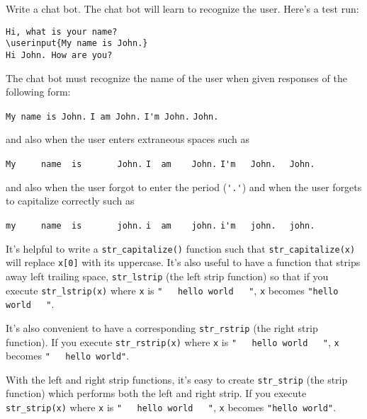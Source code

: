 Write a chat bot.
The chat bot will learn to recognize the user.
Here's a test run:
\begin{Verbatim}[frame=single,commandchars=\\\{\}]
Hi, what is your name?
\userinput{My name is John.}
Hi John. How are you?
\end{Verbatim}

The chat bot must recognize the name of the user when given responses of the
following form:
\begin{tightlist}
  \li \verb!My name is John.!
  \li \verb!I am John.!
  \li \verb!I'm John.!
  \li \verb!John.!
\end{tightlist}
and also when the user enters extraneous spaces such as
\begin{tightlist}
  \li \verb!My     name  is       John.!
  \li \verb!I  am    John.!
  \li \verb!I'm   John.  !
  \li \verb!John.    !
\end{tightlist}
and also when the user forgot to enter the period (\verb!'.'!)
and when the user forgets to capitalize correctly such as
\begin{tightlist}
  \li \verb!my     name  is       john.!
  \li \verb!i  am    john.!
  \li \verb!i'm   john.  !
  \li \verb!john.    !
\end{tightlist}

It's helpful to write a \verb!str_capitalize()! function such that
\verb!str_capitalize(x)! will replace \verb!x[0]! with
its uppercase.
It's also useful to have a function that strips away
left trailing space, \verb!str_lstrip! (the left strip function) so that if you
execute
\verb!str_lstrip(x)!
where \verb!x! is
\verb!"   hello world   "!,
\verb!x! becomes
\verb!"hello world   "!.

It's also convenient to have a corresponding \verb!str_rstrip! (the right strip function).
If you
execute
\verb!str_rstrip(x)!
where \verb!x! is
\verb!"   hello world   "!,
\verb!x! becomes
\verb!"   hello world"!.

With the left and right strip functions, it's easy to create \verb!str_strip! (the strip function)
which performs both the left and right strip.
If you
execute
\verb!str_strip(x)!
where \verb!x! is
\verb!"   hello world   "!,
\verb!x! becomes
\verb!"hello world"!.
